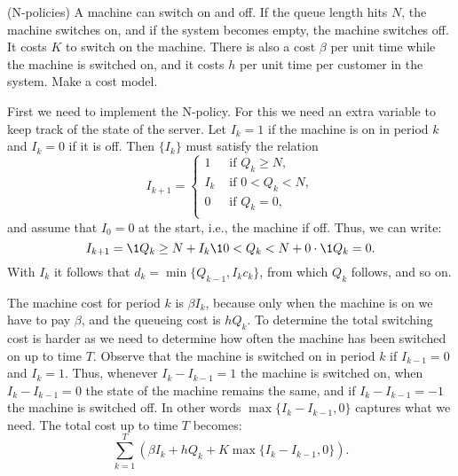 \begin{exercise}(N-policies) A machine can switch on and off. If the
  queue length hits $N$, the machine switches on, and if the system
  becomes empty, the machine switches off. It costs $K$ to switch on
  the machine. There is also a cost $\beta$ per unit time while the
  machine is switched on, and it costs $h$ per unit time per customer
  in the system. Make a cost model. 
  \begin{solution}
    First we need to implement the N-policy. For this we need an extra
    variable to keep track of the state of the server. Let $I_k=1$ if the machine is on in period $k$ and $I_k=0$ if it is off. Then $\{I_k\}$ must satisfy the relation
    \begin{equation*}
      I_{k+1} =
      \begin{cases}
        1 & \text{ if } Q_{k} \geq N,\\
        I_k & \text{ if } 0< Q_{k} <N,\\
        0 & \text{ if }  Q_{k} =0,\\
      \end{cases}
    \end{equation*}
and assume that $I_0 =0$ at the start, i.e., the machine if off. Thus, we can write:
\begin{equation*}
  I_{k+1} = \1{Q_k\geq N} + I_k \1{0<Q_k<N} + 0\cdot \1{Q_k = 0}.
\end{equation*}
With $I_k$ it follows that $d_k =\min\{Q_{k-1}, I_k c_k\}$, from which
$Q_k$ follows, and so on.

The machine cost for period $k$ is $\beta I_k$, because only when the
machine is on we have to pay $\beta$, and the queueing cost is
$h Q_k$. To determine the total switching cost is harder as we need to
determine how often the machine has been switched on up to time
$T$. Observe that the machine is switched on in period $k$ if
$I_{k-1} = 0$ and $I_k=1$. Thus, whenever $I_k - I_{k-1}=1$ the
machine is switched on, when $I_k - I_{k-1}=0$ the state of the
machine remains the same, and if $I_k - I_{k-1} = -1$ the machine is
switched off. In other words $\max\{I_k - I_{k-1},0\}$ captures what
we need. The total cost up to time $T$ becomes:
\begin{equation*}
  \sum_{k=1}^T \left(\beta I_k + h Q_k + K\max\{I_k - I_{k-1}, 0\}\right).
\end{equation*}
  \end{solution}
\end{exercise}




